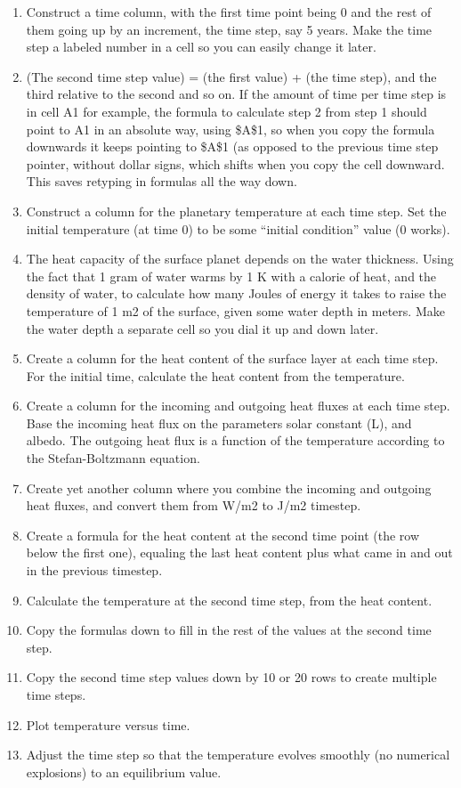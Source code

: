 {\begin{enumerate}
	\item Construct a time column, with the first time point being 0 and the rest of them going up by an increment, the time step, say 5 years. Make the time step a labeled number in a cell so you can easily change it later. 
	\item (The second time step value) = (the first value) + (the time step), and the third relative to the second and so on. If the amount of time per time step is in cell A1 for example, the formula to calculate step 2 from step 1 should point to A1 in an absolute way, using {\$A\$1}, so when you copy the formula downwards it keeps pointing to {\$A\$1} (as opposed to the previous time step pointer, without dollar signs, which shifts when you copy the cell downward. This saves retyping in formulas all the way down.
	\item Construct a column for the planetary temperature at each time step. Set the initial temperature (at time 0) to be some “initial condition” value (0 works).
	\item The heat capacity of the surface planet depends on the water thickness. Using the fact that 1 gram of water warms by 1 K with a calorie of heat, and the density of water, to calculate how many Joules of energy it takes to raise the temperature of 1 m2 of the surface, given some water depth in meters. Make the water depth a separate cell so you dial it up and down later.
	\item Create a column for the heat content of the surface layer at each time step. For the initial time, calculate the heat content from the temperature.
	\item Create a column for the incoming and outgoing heat fluxes at each time step. Base the incoming heat flux on the parameters solar constant (L), and albedo. The outgoing heat flux is a function of the temperature according to the Stefan-Boltzmann equation.
	\item Create yet another column where you combine the incoming and outgoing heat fluxes, and convert them from W/m2 to J/m2 timestep.
	\item Create a formula for the heat content at the second time point (the row below the first one), equaling the last heat content plus what came in and out in the previous timestep.
	\item Calculate the temperature at the second time step, from the heat content.
	\item Copy the formulas down to fill in the rest of the values at the second time step.
	\item Copy the second time step values down by 10 or 20 rows to create multiple time steps.
	\item Plot temperature versus time.
	\item Adjust the time step so that the temperature evolves smoothly (no numerical explosions) to an equilibrium value.
\end{enumerate}

}
